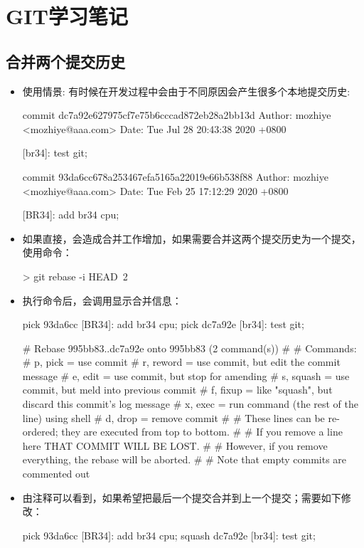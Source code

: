 \section{GIT学习笔记}
\subsection{合并两个提交历史}
\begin{itemize}
\item 使用情景: 有时候在开发过程中会由于不同原因会产生很多个本地提交历史:
\begin{messagebox}
commit dc7a92e627975cf7e75b6cccad872eb28a2bb13d
Author: mozhiye <mozhiye@aaa.com>
Date:   Tue Jul 28 20:43:38 2020 +0800

    [br34]: test git;

commit 93da6cc678a253467efa5165a22019e66b538f88
Author: mozhiye <mozhiye@aaa.com>
Date:   Tue Feb 25 17:12:29 2020 +0800

    [BR34]: add br34 cpu;
\end{messagebox}

\item 如果直接，会造成合并工作增加，如果需要合并这两个提交历史为一个提交， 使用命令：
\begin{commandbox}
 > git rebase -i HEAD~2
\end{commandbox}

\item 执行命令后，会调用显示合并信息：

\begin{messagebox}
pick 93da6cc [BR34]: add br34 cpu;
pick dc7a92e [br34]: test git;

# Rebase 995bb83..dc7a92e onto 995bb83 (2 command(s))
#
# Commands:
# p, pick = use commit
# r, reword = use commit, but edit the commit message
# e, edit = use commit, but stop for amending
# s, squash = use commit, but meld into previous commit
# f, fixup = like "squash", but discard this commit's log message
# x, exec = run command (the rest of the line) using shell
# d, drop = remove commit
#
# These lines can be re-ordered; they are executed from top to bottom.
#
# If you remove a line here THAT COMMIT WILL BE LOST.
#
# However, if you remove everything, the rebase will be aborted.
#
# Note that empty commits are commented out
\end{messagebox}

\item 由注释可以看到，如果希望把最后一个提交合并到上一个提交；需要如下修改：
\begin{messagebox}
pick 93da6cc [BR34]: add br34 cpu;
squash dc7a92e [br34]: test git;
\end{messagebox}


\end{itemize}
